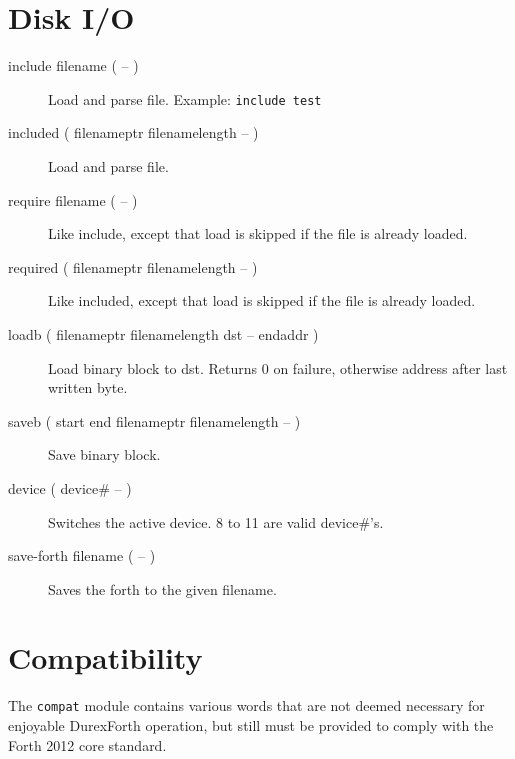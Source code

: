 \section{Disk I/O}

\begin{description}
\item[include filename ( -- )] Load and parse file. Example: \texttt{include test}
\item[included ( filenameptr filenamelength -- )] Load and parse file.
\item[require filename ( -- )] Like include, except that load is skipped if the file is already loaded.
\item[required ( filenameptr filenamelength -- )] Like included, except that load is skipped if the file is already loaded.
\item[loadb ( filenameptr filenamelength dst -- endaddr )] Load binary block to dst. Returns 0 on failure, otherwise address after last written byte.
\item[saveb ( start end filenameptr filenamelength -- )] Save binary block.
\item[device ( device\# -- )] Switches the active device. 8 to 11 are valid device\#'s.
\item[save-forth filename ( -- )] Saves the forth to the given filename.
\end{description}

\section{Compatibility}

The \texttt{compat} module contains various words that are not deemed necessary for enjoyable DurexForth operation, but still must be provided to comply with the Forth 2012 core standard.

